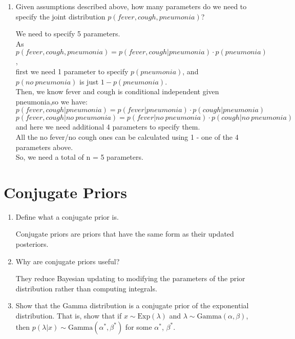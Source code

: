 \documentclass[11pt]{article}
\begin{document}
\begin{enumerate}
\item Given assumptions described above, how many parameters do we need to specify the joint distribution $p(fever, cough, pneumonia)$?  \\
\begin{answertext}{6cm}{}
We need to specify 5 parameters.\\
As  $p(fever, cough, pneumonia) = p(fever, cough|pneumonia) \cdot p(pneumonia)$,  \\
first we need 1 parameter to specify $p(pneumonia)$, and $p(no \ pneumonia)$ is just $1 - p(pneumonia)$. \\
Then, we know fever and cough is conditional independent given pneumonia,so we have: \\
$p(fever, cough|pneumonia) = p(fever|pneumonia) \cdot p(cough|pneumonia)$\\
$p(fever, cough|no \ pneumonia) = p(fever|no \ pneumonia) \cdot p(cough|no \ pneumonia)$\\
and here we need additional 4 parameters to specify them.\\
All the no fever/no cough ones can be calculated using 1 - one of the 4 parameters above. \\
So, we need a total of n = 5 parameters.
\end{answertext} 
\end{enumerate}


\pagebreak
\section{Conjugate Priors}
\begin{enumerate}
\item Define what a conjugate prior is.\\
\begin{answertext}{3cm}{}  
Conjugate priors are priors that have the same form as their updated posteriors.
\end{answertext} 

\item Why are conjugate priors useful? \\
\begin{answertext}{3cm}{}
They reduce Bayesian updating to modifying the parameters of the prior distribution rather than computing integrals.
\end{answertext} 

\item Show that the Gamma distribution is a conjugate prior of the exponential distribution. That is, show that if $x \sim \text{Exp}(\lambda)$ and $\lambda \sim \text{Gamma}(\alpha, \beta)$, then $p(\lambda | x) \sim \text{Gamma}(\alpha^*, \beta^*)$ for some $\alpha^*$, $\beta^*$. \\
\begin{answertext}{6cm}{}
\end{answertext} 
\end{enumerate}
\end{document}
